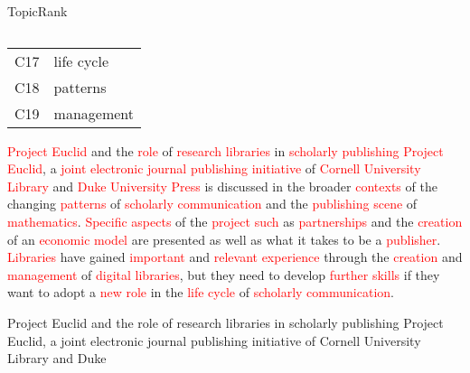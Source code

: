 \begin{frame}[label=topicrank]{TopicRank}
\begin{columns}
\begin{column}{.55\textwidth}
{{{{\begin{tabular}{cl}
                    C17 & life cycle\\
                    C18 & patterns\\
                    C19 & management\\
                    \bottomrule
                  \end{tabular}
                }
              }
            }{ %
              \begin{exampleblock}{\footnotesize \textcolor{red}{Project Euclid}
                                   and the \textcolor{red}{role} of
                                   \textcolor{red}{research libraries} in
                                   \textcolor{red}{scholarly publishing}}
                \justifying
                \footnotesize \textcolor{red}{Project Euclid}, a
                \textcolor{red}{joint electronic journal publishing initiative}
                of \textcolor{red}{Cornell University Library} and
                \textcolor{red}{Duke University Press} is discussed in the
                broader \textcolor{red}{contexts} of the changing
                \textcolor{red}{patterns} of \textcolor{red}{scholarly
                communication} and the \textcolor{red}{publishing scene} of
                \textcolor{red}{mathematics}. \textcolor{red}{Specific aspects}
                of the \textcolor{red}{project such} as
                \textcolor{red}{partnerships} and the \textcolor{red}{creation}
                of an \textcolor{red}{economic model} are presented as well as
                what it takes to be a \textcolor{red}{publisher}.
                \textcolor{red}{Libraries} have gained
                \textcolor{red}{important} and \textcolor{red}{relevant
                experience} through the \textcolor{red}{creation} and
                \textcolor{red}{management} of \textcolor{red}{digital
                libraries}, but they need to develop \textcolor{red}{further
                skills} if they want to adopt a \textcolor{red}{new role} in the
                \textcolor{red}{life cycle} of \textcolor{red}{scholarly
                communication}.
              \end{exampleblock}
            }
          }{ %
            \begin{exampleblock}{\footnotesize Project Euclid and the role of
                                 research libraries in scholarly publishing}
              \justifying
              \footnotesize Project Euclid, a joint electronic journal
              publishing initiative of Cornell University Library and Duke

\end{exampleblock}}
\end{column}
\end{columns}
\end{frame}
